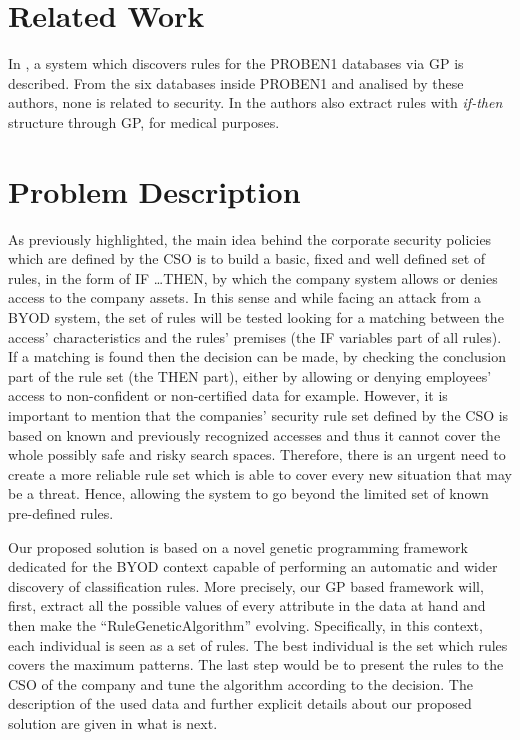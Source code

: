 \documentclass[a4paper,10pt,twocolumn,preprint,3p]{elsarticle}
\begin{document}
\section{Related Work}
\label{sec:SotA}


In \cite{DeFalco2002257}, a system which discovers rules for the PROBEN1 databases via GP is described. From the six databases inside PROBEN1 and analised by these authors, none is related to security.
In \cite{Tsakonas2004195} the authors also extract rules with
\textit{if-then} structure through GP, for medical purposes. 

\section{Problem Description}
\label{sec:problem}

As previously highlighted, the main idea behind the corporate security policies which are defined by the CSO is to build a basic, fixed and well defined set of rules, in the form of IF \ldots THEN,  by which the company system allows or denies access to the company assets. In this sense and while facing an attack from a BYOD system, the set of rules will be tested looking for a matching between the access' characteristics and the rules' premises (the IF variables part of all rules). If a matching is found then the decision can be made, by checking the conclusion part of the rule set (the THEN part), either by allowing or denying employees' access to non-confident or non-certified data for example. However, it is important to mention that the companies' security rule set defined by the CSO is based on known and previously recognized accesses and thus it cannot cover the whole possibly safe and risky search spaces. Therefore, there is an urgent need to create a more reliable rule set which is able to cover every new situation that may be a threat. Hence, allowing the system to go beyond the limited set of known pre-defined rules.

Our proposed solution is based on a novel genetic programming framework dedicated for the BYOD context capable of performing an automatic and wider discovery of classification rules. More precisely, our GP based framework will, first, extract all the possible values of every attribute in the data at hand and then make the ``RuleGeneticAlgorithm'' evolving. Specifically, in this context, each individual is seen as a set of rules. The best individual is the set which rules covers the maximum patterns. The last step would be to present the rules to the CSO of the company and tune the algorithm according to the decision. The description of the used data and further explicit details about our proposed solution are given in what is next.
\end{document}
